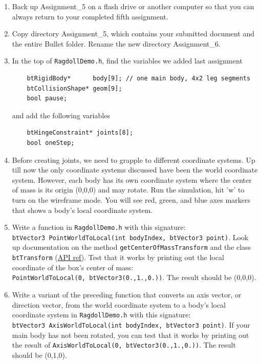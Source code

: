 \documentclass[12pt]{article}
\begin{document}
\begin{enumerate}

\item Back up Assignment\_5 on a flash drive or another computer so that you can always return to your completed fifth assignment.

\item Copy directory Assignment\_5, which contains your submitted document and the entire Bullet folder. Rename the new directory Assignment\_6.

\item In the top of \verb|RagdollDemo.h|, find the variables we added last assignment
\begin{verbatim}
    btRigidBody*      body[9]; // one main body, 4x2 leg segments
    btCollisionShape* geom[9];
    bool pause;
\end{verbatim}
and add the following variables
\begin{verbatim}
    btHingeConstraint* joints[8];
    bool oneStep;
\end{verbatim}

\item Before creating joints, we need to grapple to different
  coordinate systems.  Up till now the only coordinate systems
  discussed have been the world coordinate system.  However, each body
  has its own coordinate system where the center of mass is its origin
  (0,0,0) and may rotate.  Run the simulation, hit 'w' to turn on the
  wireframe mode.  You will see red, green, and blue axes markers that
  shows a body's local coordinate system.

\item Write a function in \verb|RagdollDemo.h| with this signature:
  \\\verb|btVector3 PointWorldToLocal(int bodyIndex, btVector3 point)|.
  Look up documentation on the method \verb|getCenterOfMassTransform|
  and the class \verb|btTransform| (\href{http://bulletphysics.com/Bullet/BulletFull/classbtTransform.html}{API ref}).  Test that it works by printing
  out the local coordinate of the box's center of mass:
  \\\verb|PointWorldToLocal(0, btVector3(0.,1.,0.))|.  The result
  should be (0,0,0).

\item Write a variant of the preceding function that converts an axis
  vector, or direction vector, from the world coordinate system to a
  body's local coordinate system in \verb|RagdollDemo.h| with this
  signature:
  \\\verb|btVector3 AxisWorldToLocal(int bodyIndex, btVector3 point)|.
  If your main body has not been rotated, you can test that it works
  by printing out the result of
  \verb|AxisWorldToLocal(0, btVector3(0.,1.,0.))|.  The result should
  be (0,1,0).



\end{enumerate}
\end{document}
